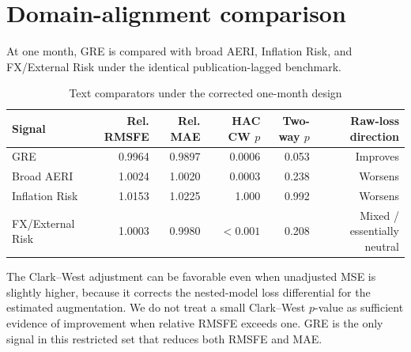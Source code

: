 \documentclass[12pt]{article}
\begin{document}
\section{Domain-alignment comparison}
At one month, GRE is compared with broad AERI, Inflation Risk, and FX/External Risk under the identical publication-lagged benchmark.
\begin{table}[htbp]
\centering\scriptsize
\caption{Text comparators under the corrected one-month design}
\begin{tabular}{lrrrrr}
\toprule
Signal & Rel. RMSFE & Rel. MAE & HAC CW $p$ & Two-way $p$ & Raw-loss direction\\
\midrule
GRE & 0.9964 & 0.9897 & 0.0006 & 0.053 & Improves\\
Broad AERI & 1.0024 & 1.0020 & 0.0003 & 0.238 & Worsens\\
Inflation Risk & 1.0153 & 1.0225 & 1.000 & 0.992 & Worsens\\
FX/External Risk & 1.0003 & 0.9980 & $<0.001$ & 0.208 & Mixed / essentially neutral\\
\bottomrule
\end{tabular}
\end{table}

The Clark--West adjustment can be favorable even when unadjusted MSE is slightly higher, because it corrects the nested-model loss differential for the estimated augmentation. We do not treat a small Clark--West $p$-value as sufficient evidence of improvement when relative RMSFE exceeds one. GRE is the only signal in this restricted set that reduces both RMSFE and MAE.
\end{document}
